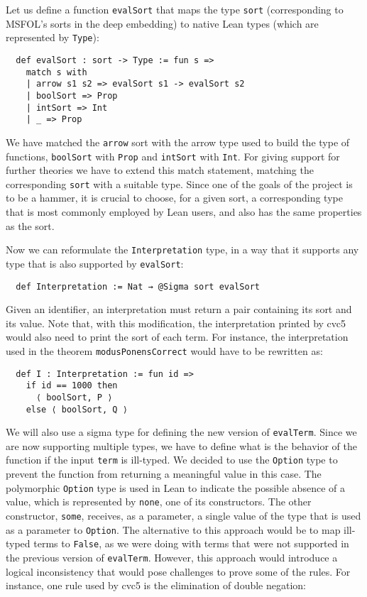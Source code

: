 Let us define a function \texttt{evalSort} that maps the type \texttt{sort}
(corresponding to MSFOL's sorts in the deep embedding) to native Lean types
(which are represented by \texttt{Type}):

\begin{verbatim}
  def evalSort : sort -> Type := fun s =>
    match s with
    | arrow s1 s2 => evalSort s1 -> evalSort s2
    | boolSort => Prop
    | intSort => Int
    | _ => Prop
\end{verbatim}

We have matched the \texttt{arrow} sort with the arrow type used to build the type of
functions, \texttt{boolSort} with \texttt{Prop} and \texttt{intSort} with \texttt{Int}.
For giving support for further theories we have to extend this match statement,
matching the corresponding \texttt{sort} with a suitable type. Since one of the goals
of the project is to be a hammer, it is crucial to choose, for a given sort,
a corresponding type that is most commonly employed by Lean users, and also
has the same properties as the sort.

Now we can reformulate the \texttt{Interpretation} type, in a way that
it supports any type that is also supported by \texttt{evalSort}:

\begin{verbatim}
  def Interpretation := Nat → @Sigma sort evalSort
\end{verbatim}

Given an identifier, an interpretation must return a pair containing its sort
and its value. Note that, with this modification, the interpretation printed
by cvc5 would also need to print the sort of each term. For instance,
the interpretation used in the theorem \texttt{modusPonensCorrect} would have
to be rewritten as:

\begin{verbatim}
  def I : Interpretation := fun id =>
    if id == 1000 then
      ⟨ boolSort, P ⟩
    else ⟨ boolSort, Q ⟩
\end{verbatim}

We will also use a sigma type for defining the new version of \texttt{evalTerm}.
%
Since we are now supporting multiple types, we have to define what is the behavior
of the function if the input \texttt{term} is ill-typed.
We decided to use the \texttt{Option} type to prevent the function from returning
a meaningful value in this case. The polymorphic \texttt{Option} type is
used in Lean to
indicate the possible absence of a value, which is represented by \texttt{none}, one of its
constructors. The other constructor, \texttt{some}, receives, as a parameter, a single value
of the type that is used as a parameter to \texttt{Option}.
The alternative to this approach would be to map ill-typed
terms to \texttt{False}, as we were doing with terms that were not supported
in the previous version of \texttt{evalTerm}.
However, this approach would introduce
a logical inconsistency that would pose challenges to prove some of the rules.
For instance, one rule used by cvc5 is the elimination of double negation:

